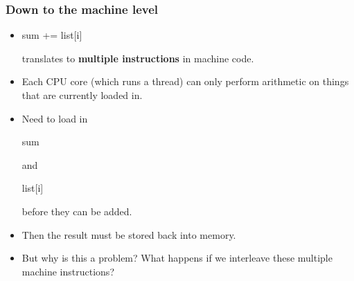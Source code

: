 \documentclass[table]{beamer}
\newcommand{\ttt}[1]{\begin{tt}#1\end{tt}}
\begin{document}
 \begin{frame}
    \frametitle{Down to the machine level}
    \begin{itemize}
        \item<1-> \ttt{sum += list[i]} translates to \textbf{multiple
        instructions} in machine code.
        \item<2-> Each CPU core (which runs a thread) can only perform
        arithmetic on things that are currently loaded in.
        \item<3-> Need to load in \ttt{sum} and \ttt{list[i]} before they
        can be added.
        \item<4-> Then the result must be stored back into memory.
        \item<5-> But why is this a problem? What happens if we interleave
        these multiple machine instructions?
    \end{itemize}
 \end{frame}
\end{document}
